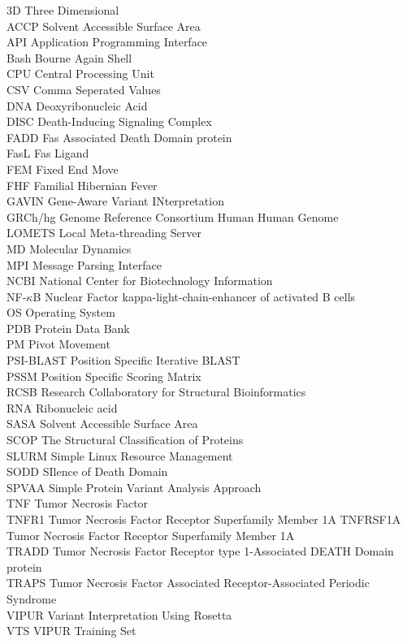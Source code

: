 3D Three Dimensional\\
ACCP Solvent Accessible Surface Area\\
API Application Programming Interface\\
Bash Bourne Again Shell\\
CPU Central Processing Unit\\
CSV Comma Seperated Values\\
DNA Deoxyribonucleic Acid\\
DISC Death-Inducing Signaling Complex\\
FADD Fas Associated Death Domain protein\\
FasL Fas Ligand\\
FEM Fixed End Move\\
FHF Familial Hibernian Fever\\
GAVIN Gene-Aware Variant INterpretation\\
GRCh/hg Genome Reference Consortium Human Human Genome\\
LOMETS Local Meta-threading Server\\
MD	Molecular Dynamics\\
MPI Message Parsing Interface\\
NCBI National Center for Biotechnology Information\\
NF-$\kappa$B Nuclear Factor kappa-light-chain-enhancer of activated B cells\\
OS Operating System\\
PDB Protein Data Bank\\
PM Pivot Movement\\
PSI-BLAST Position Specific Iterative BLAST\\
PSSM Position Specific Scoring Matrix\\
RCSB Research Collaboratory for Structural Bioinformatics\\
RNA Ribonucleic acid\\
SASA Solvent Accessible Surface Area\\
SCOP The Structural Classification of Proteins\\
SLURM Simple Linux Resource Management\\
SODD SIlence of Death Domain\\
SPVAA Simple Protein Variant Analysis Approach\\
TNF Tumor Necrosis Factor\\
TNFR1 Tumor Necrosis Factor Receptor Superfamily Member 1A
TNFRSF1A Tumor Necrosis Factor Receptor Superfamily Member 1A\\
TRADD Tumor Necrosis Factor Receptor type 1-Associated DEATH Domain protein\\
TRAPS Tumor Necrosis Factor Associated Receptor-Associated Periodic Syndrome\\
VIPUR Variant Interpretation Using Rosetta\\
VTS VIPUR Training Set\\